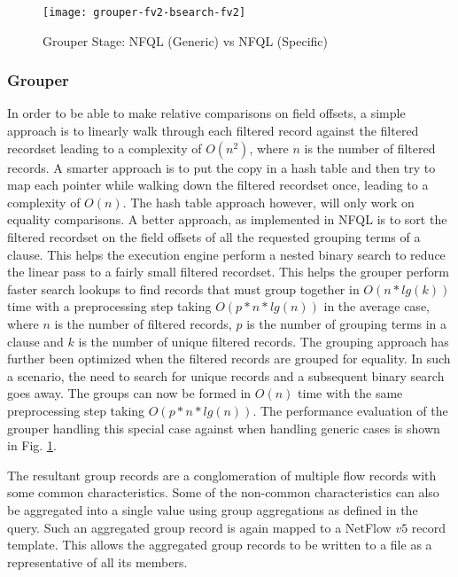 \begin{figure}[ht!]
  \begin{center}
    \texttt{[image: grouper-fv2-bsearch-fv2]}
    \caption{Grouper Stage: NFQL (Generic) vs NFQL (Specific)}
    \label{fig:fv1-fv2-grouper}
  \end{center}
\end{figure}

\subsubsection{Grouper}

In order to be able to make relative comparisons on field offsets, a simple
approach is to linearly walk through each filtered record against the filtered
recordset leading to a complexity of $O(n^2)$, where $n$ is the number of
filtered records. A smarter approach is to put the copy in a hash table and
then try to map each pointer while walking down the filtered recordset once,
leading to a complexity of $O(n)$. The hash table approach however, will only
work on equality comparisons. A better approach, as implemented in \ac{NFQL}
is to sort the filtered recordset on the field offsets of all the requested
grouping terms of a clause. This helps the execution engine perform a nested
binary search to reduce the linear pass to a fairly small filtered recordset.
This helps the grouper perform faster search lookups to find records that must
group together in $O(n*lg(k))$ time with a preprocessing step taking
$O(p*n*lg(n))$ in the average case, where $n$ is the number of filtered
records, $p$ is the number of grouping terms in a clause and $k$ is the number
of unique filtered records. The grouping approach has further been optimized
when the filtered records are grouped for equality. In such a scenario, the
need to search for unique records and a  subsequent binary search goes away.
The groups can now be formed in $O(n)$ time with the same preprocessing step
taking $O(p*n*lg(n))$.  The performance evaluation of the grouper handling
this special case against when handling generic cases is shown in Fig.
\ref{fig:fv1-fv2-grouper}.

The resultant group records are a conglomeration of multiple flow records with
some common characteristics. Some of the non-common characteristics can also
be aggregated into a single value using group aggregations as defined in the
query. Such an aggregated group record is again mapped to a NetFlow $v5$
record template. This allows the aggregated group records to be written to a
file as a representative of all its members.

